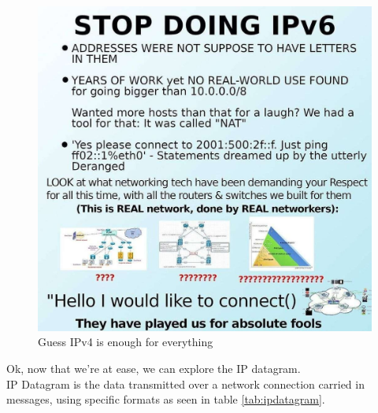 \documentclass[11pt,a4paper]{report}
\begin{document}
        \begin{figure}[h]
            \centering
            \includegraphics[scale=0.3]{stopdoingipv6} 
            \caption{Guess IPv4 is enough for everything}
            \label{fig:funnyipv6}
        \end{figure}
        \pagebreak

        Ok, now that we're at ease, we can explore the IP datagram.\\
        IP Datagram is the data transmitted over a network connection carried in messages, using specific formats as seen in table \ref{tab:ipdatagram}.
\end{document}
